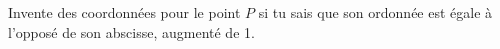 %
%
    Invente des coordonnées pour le point $P$ si tu sais que son ordonnée est égale à l'opposé de son abscisse, augmenté de 1.
